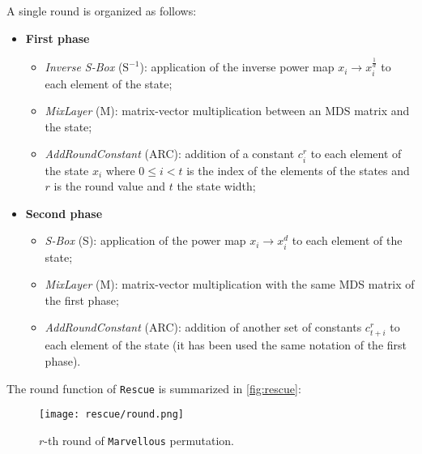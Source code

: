 \documentclass[12pt, a4paper]{report}
\begin{document}
A single round is organized as follows:
\begin{itemize}
  \item \textbf{First phase}
  \begin{itemize}
    \item \textit{Inverse S-Box} ($\text{S}^{-1}$): application of the inverse power map $x_i \rightarrow x_i^{\frac{1}{d}}$ to each element of the state;
    \item \textit{MixLayer} (M): matrix-vector multiplication between an MDS matrix and the state;
    \item \textit{AddRoundConstant} (ARC): addition of a constant $c^r_i$ to each element of the state $x_i$ where $0 \le i < t$ is the index of the elements of the states and $r$ is the round value and $t$ the state width;
  \end{itemize}
  \newpage
  \item \textbf{Second phase}
  \begin{itemize}
    \item \textit{S-Box} (S): application of the power map $x_i \rightarrow x_i^d$ to each element of the state;
    \item \textit{MixLayer} (M): matrix-vector multiplication with the same MDS matrix of the first phase;
    \item \textit{AddRoundConstant} (ARC): addition of another set of constants $c^r_{t+i}$ to each element of the state (it has been used the same notation of the first phase).
  \end{itemize}
\end{itemize}

The round function of \texttt{Rescue} is summarized in \autoref{fig:rescue}:
\begin{figure}[H]
  \begin{center}
    \hspace{30pt}
    \texttt{[image: rescue/round.png]}
  \end{center}
  \caption{$r$-th round of \texttt{Marvellous} permutation.}\label{fig:rescue}
\end{figure}
\end{document}
